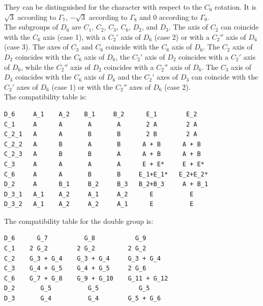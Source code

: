 \documentclass[12pt,a4paper]{article}
\begin{document}
They can be distinguished for the character with respect to the $C_6$ rotation.
It is $\sqrt{3}$ according to $\Gamma_7$, $-\sqrt{3}$ according to $\Gamma_8$ 
and $0$ according to $\Gamma_9$.\\
The subgroups of $D_6$ are $C_1$, $C_2$, $C_3$, $C_6$, $D_2$, and $D_3$. 
The axis of $C_2$ can coincide with the $C_6$ axis (case 1), with a $C_2'$ axis 
of $D_6$ (case 2) or with a $C_2''$ axis of $D_6$ (case 3). 
The axes of $C_3$ and $C_6$ coincide with the $C_6$ axis of $D_6$. 
The $C_2$ axis of $D_2$ coincides with the 
$C_6$ axis of $D_6$, the $C_2'$ axis of $D_2$ coincides with a $C_2'$ axis of $D_6$,
while the $C_2''$ axis of $D_2$ coincides with a $C_2''$ axis of $D_6$. 
The $C_3$ axis of $D_3$ coincides with the $C_6$ axis of $D_6$ and the $C_2'$ axes
of $D_3$ can coincide with the $C_2'$ axes of $D_6$ (case 1) or with the
$C_2''$ axes of $D_6$ (case 2).\\
The compatibility table is:
\begin{verbatim}
D_6     A_1    A_2    B_1     B_2      E_1        E_2
C_1     A      A       A       A       2 A        2 A
C_2_1   A      A       B       B       2 B        2 A
C_2_2   A      B       A       B      A + B      A + B
C_2_3   A      B       B       A      A + B      A + B
C_3     A      A       A       A      E + E*     E + E*      
C_6     A      A       B       B     E_1+E_1*   E_2+E_2*   
D_2     A      B_1     B_2     B_3   B_2+B_3     A + B_1
D_3_1   A_1    A_2     A_1     A_2      E          E
D_3_2   A_1    A_2     A_2     A_1      E          E
\end{verbatim}
The compatibility table for the double group is:
\begin{verbatim}
D_6      G_7          G_8           G_9 
C_1    2 G_2        2 G_2         2 G_2
C_2    G_3 + G_4    G_3 + G_4     G_3 + G_4
C_3    G_4 + G_5    G_4 + G_5     2 G_6
C_6    G_7 + G_8    G_9 + G_10    G_11 + G_12
D_2       G_5          G_5           G_5
D_3       G_4          G_4        G_5 + G_6
\end{verbatim}
\end{document}

